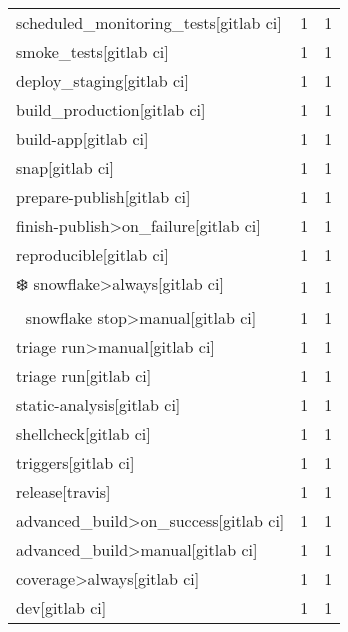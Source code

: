 \begin{tabular}{lrr}
scheduled\_monitoring\_tests[gitlab ci]      &                   1 &             1 \\
smoke\_tests[gitlab ci]                     &                   1 &             1 \\
deploy\_staging[gitlab ci]                  &                   1 &             1 \\
build\_production[gitlab ci]                &                   1 &             1 \\
build-app[gitlab ci]                       &                   1 &             1 \\
snap[gitlab ci]                            &                   1 &             1 \\
prepare-publish[gitlab ci]                 &                   1 &             1 \\
finish-publish>on\_failure[gitlab ci]       &                   1 &             1 \\
reproducible[gitlab ci]                    &                   1 &             1 \\
❄️ snowflake>always[gitlab ci]             &                   1 &             1 \\
🛑 snowflake stop>manual[gitlab ci]         &                   1 &             1 \\
triage run>manual[gitlab ci]               &                   1 &             1 \\
triage run[gitlab ci]                      &                   1 &             1 \\
static-analysis[gitlab ci]                 &                   1 &             1 \\
shellcheck[gitlab ci]                      &                   1 &             1 \\
triggers[gitlab ci]                        &                   1 &             1 \\
release[travis]                            &                   1 &             1 \\
advanced\_build>on\_success[gitlab ci]       &                   1 &             1 \\
advanced\_build>manual[gitlab ci]           &                   1 &             1 \\
coverage>always[gitlab ci]                 &                   1 &             1 \\
dev[gitlab ci]                             &                   1 &             1 \\

\end{tabular}
